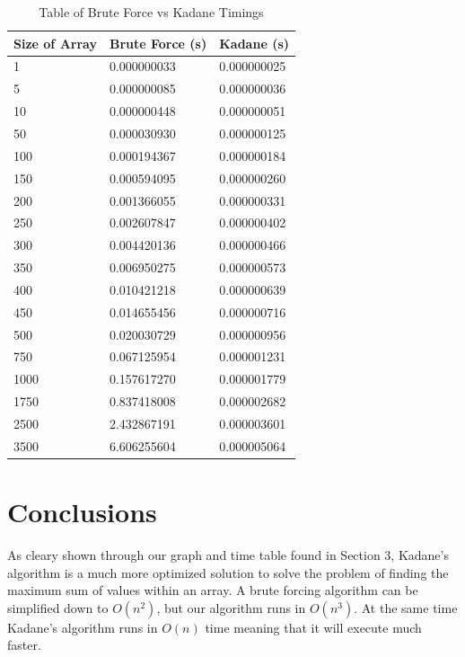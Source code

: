 \documentclass[10pt, letterpaper]{article}
\begin{document}
\begin{table}[htb!]
	\begin{center}
	\caption{
		\label{fig:time-table} Table of Brute Force vs Kadane Timings}
	\medskip
	\begin{tabular}{ | p{2cm} | l | l | }
		\hline
		Size of Array & Brute Force (s) & Kadane (s) \\ \hline
		1 & 0.000000033 & 0.000000025 \\ \hline
		5 & 0.000000085 & 0.000000036 \\ \hline
		10 & 0.000000448 & 0.000000051 \\ \hline
		50 & 0.000030930 & 0.000000125 \\ \hline
		100 & 0.000194367 & 0.000000184 \\ \hline
		150 & 0.000594095 & 0.000000260 \\ \hline
		200 & 0.001366055 & 0.000000331 \\ \hline
		250 & 0.002607847 & 0.000000402 \\ \hline
		300 & 0.004420136 & 0.000000466 \\ \hline
		350 & 0.006950275 & 0.000000573 \\ \hline
		400 & 0.010421218 & 0.000000639 \\ \hline
		450 & 0.014655456 & 0.000000716 \\ \hline
		500 & 0.020030729 & 0.000000956 \\ \hline
		750 & 0.067125954 & 0.000001231 \\ \hline
		1000 & 0.157617270 & 0.000001779 \\ \hline
		1750 & 0.837418008 & 0.000002682 \\ \hline
		2500 & 2.432867191 & 0.000003601 \\ \hline
		3500 & 6.606255604 & 0.000005064 \\ \hline
	\end{tabular}
	\end{center}
\end{table}

	\section{Conclusions}
	As cleary shown through our graph and time table found in Section 3,
	Kadane's algorithm is a much more optimized solution to solve the problem of finding the maximum sum of values within an array.
	A brute forcing algorithm can be simplified down to $O(n^2)$, but our algorithm runs in $O(n^3)$.
	At the same time Kadane's algorithm runs in $O(n)$ time meaning that it will execute much faster.
\end{document}
